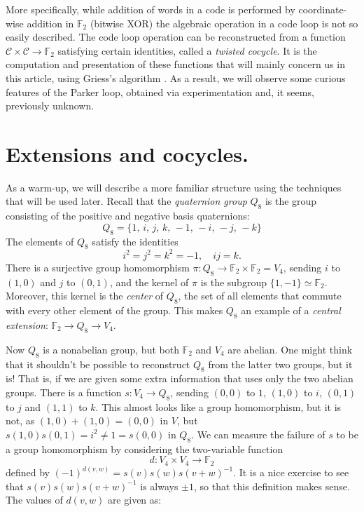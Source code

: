 \documentclass{article}
\theoremstyle{plain}
\theoremstyle{definition}
\def \cC {\mathcal{C}}
\def \FF {\mathbb{F}}
\begin{document}
More specifically, while addition of words in a code is performed by coordinate-wise addition in $\FF_2$ (bitwise XOR) the algebraic operation in a code loop is not so easily described.
The code loop operation can be reconstructed from a function $\cC \times \cC \to \FF_2$ satisfying certain identities, called a \emph{twisted cocycle}.
It is the computation and presentation of these functions that will mainly concern us in this article, using Griess's algorithm \cite[proof of Theorem 10]{Griess}.
As a result, we will observe some curious features of the Parker loop, obtained via experimentation and, it seems, previously unknown.

\section{Extensions and cocycles.}

As a warm-up, we will describe a more familiar structure using the techniques that will be used later. 
Recall that the \emph{quaternion group} $Q_8$ is the group consisting of the positive and negative basis quaternions:
\[
	Q_8 = \{1,\, i,\, j,\, k,\,-1,\, -i,\, -j,\, -k\}
\]
The elements of $Q_8$ satisfy the identities
\[
	i^2 = j^2 = k^2 = -1, \quad ij=k.
\]
There is a surjective group homomorphism $\pi\colon Q_8 \to \FF_2 \times \FF_2 = V_4$, sending $i$ to $(1,0)$ and $j$ to $(0,1)$, and the kernel of $\pi$ is the subgroup $\{1,-1\}\simeq \FF_2$.
Moreover, this kernel is the \emph{center} of $Q_8$, the set of all elements that commute with every other element of the group. This makes $Q_8$ an example of a \emph{central extension}: $\FF_2\to Q_8 \to V_4$.

Now $Q_8$ is a nonabelian group, but both $\FF_2$ and $V_4$ are abelian.
One might think that it shouldn't be possible to reconstruct $Q_8$ from the latter two groups, but it is! 
That is, if we are given some extra information that uses only the two abelian groups.
There is a function $s\colon V_4 \to Q_8$, sending $(0,0)$ to $1$, $(1,0)$ to $i$, $(0,1)$ to $j$ and $(1,1)$ to $k$.
This almost looks like a group homomorphism, but it is not, as $(1,0) + (1,0) = (0,0)$ in $V$, but $s(1,0)s(0,1) = i^2 \not= 1 = s(0,0)$ in $Q_8$.
We can measure the failure of $s$ to be a group homomorphism by considering the two-variable function
\[
	d\colon V_4 \times V_4 \to \FF_2
\]
defined by $ (-1)^{d(v,w)} = s(v)s(w)s(v+w)^{-1}$. 
It is a nice exercise to see that $s(v)s(w)s(v+w)^{-1}$ is always $\pm 1$, so that this definition makes sense. The values of $d(v,w)$ are given as:
\end{document}
